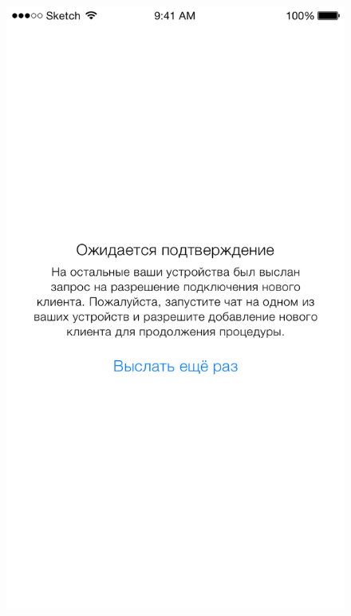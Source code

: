 \begin{figure}[h]
\centering
\begin{minipage}{.5\textwidth}
  \centering
  \includegraphics[height=0.25\textheight]{inc/img/ui/login_approve_screen.png}
  \label{sec:usage:deviceactivation:newdevice}
\end{minipage}%
\begin{minipage}{.5\textwidth}
  \centering

\end{minipage}
\end{figure}
